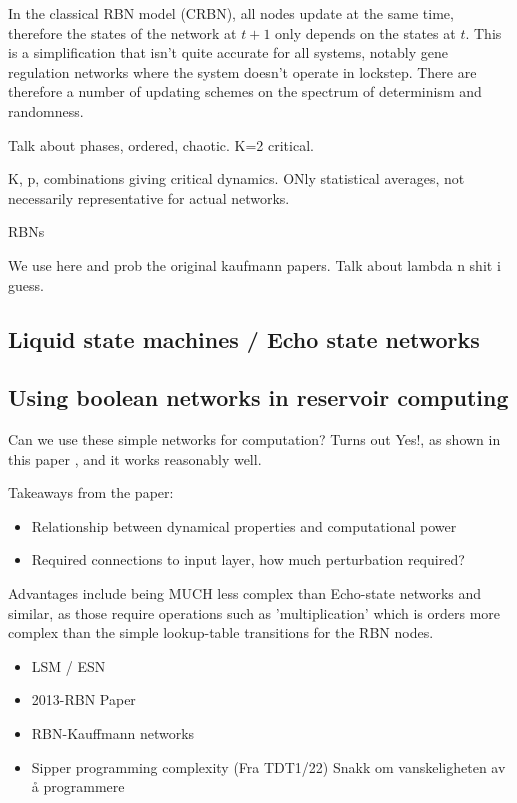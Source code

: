 In the classical RBN model (CRBN), all nodes update at the same time,
therefore the states of the network at $t+1$ only depends on the states at $t$.
This is a simplification that isn't quite accurate for all systems,
notably gene regulation networks where the system doesn't operate in lockstep.
There are therefore a number of updating schemes on the spectrum of determinism and randomness.




Talk about phases, ordered, chaotic. K=2 critical.

K, p, combinations giving critical dynamics. ONly statistical averages,
not necessarily representative for actual networks.

RBNs 



We use \cite{gershenson2004introduction} here and prob the original kaufmann papers.
Talk about lambda n shit i guess.


\subsection{Liquid state machines / Echo state networks}

\subsection{Using boolean networks in reservoir computing}

Can we use these simple networks for computation?
Turns out Yes!, as shown in this paper \cite{rbn-reservoir}, and it works reasonably well.

Takeaways from the paper:
\begin{itemize}
  \item Relationship between dynamical properties and computational power
  \item Required connections to input layer, how much perturbation required?
\end{itemize}

Advantages include being MUCH less complex than Echo-state networks and similar, as those require operations such as 'multiplication' which is orders more complex than the simple lookup-table transitions for the RBN nodes.


\begin{itemize}
  \item LSM / ESN
  \item 2013-RBN Paper
  \item RBN-Kauffmann networks
  \item Sipper programming complexity (Fra TDT1/22) Snakk om vanskeligheten av å programmere
\end{itemize}
